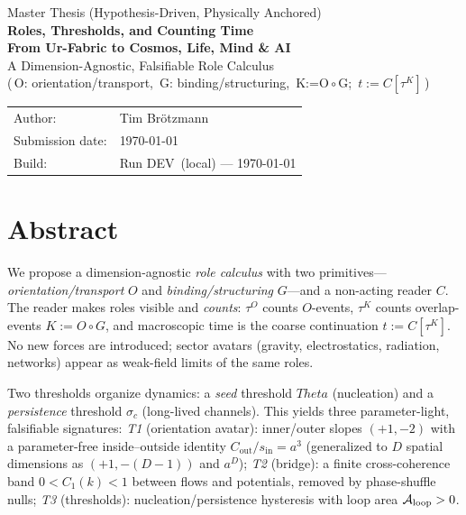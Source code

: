 \documentclass[12pt,a4paper,oneside]{scrreprt}
\def\BuildRun{DEV}\def\BuildSHA{local}\def\BuildDate{\today}%
\def\Theta{Theta}%
\begin{document}
\begin{titlepage}
  \centering
  {\Large Master Thesis (Hypothesis-Driven, Physically Anchored)}\\[0.6em]
  {\huge\bfseries Roles, Thresholds, and Counting Time}\\[0.25em]
  {\Large\bfseries From Ur-Fabric to Cosmos, Life, Mind \& AI}\\[1.0em]
  {\large A Dimension-Agnostic, Falsifiable Role Calculus}\\[-0.2em]
  {\small (\,O: orientation/transport,\ G: binding/structuring,\ K:=O$\!\circ$G;\ $t:=C[\tau^K]$\,)}\\[2.0em]

  \begin{tabular}{@{}ll@{}}
    Author: & Tim Brötzmann \\
    Submission date: & \today \\
    Build: & Run \BuildRun\ (\BuildSHA) — \BuildDate \\
  \end{tabular}

  \vfill
\end{titlepage}


\chapter*{Abstract}
We propose a dimension-agnostic \emph{role calculus} with two primitives—%
\emph{orientation/transport} $O$ and \emph{binding/structuring} $G$—and a non-acting reader $C$.
The reader makes roles visible and \emph{counts}: $\tau^O$ counts $O$-events, $\tau^K$ counts overlap-events $K:=O\!\circ G$, and macroscopic time is the coarse continuation $t:=C[\tau^K]$.
No new forces are introduced; sector avatars (gravity, electrostatics, radiation, networks) appear as weak-field limits of the same roles.

Two thresholds organize dynamics: a \emph{seed} threshold $\Theta$ (nucleation) and a \emph{persistence} threshold $\sigma_c$ (long-lived channels). This yields three parameter-light, falsifiable signatures:
\emph{T1} (orientation avatar): inner/outer slopes $(+1,-2)$ with a parameter-free inside–outside identity $C_{\mathrm{out}}/s_{\mathrm{in}}=a^3$ (generalized to $D$ spatial dimensions as $(+1,-(D\!-\!1))$ and $a^{D}$);
\emph{T2} (bridge): a finite cross-coherence band $0<C_1(k)<1$ between flows and potentials, removed by phase-shuffle nulls;
\emph{T3} (thresholds): nucleation/persistence hysteresis with loop area $\mathcal A_{\rm loop}>0$.
\end{document}
